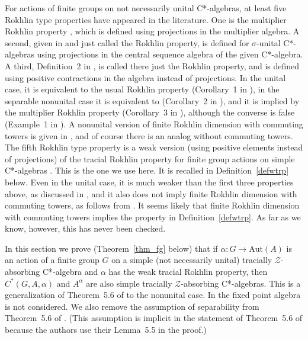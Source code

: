 \documentclass[11pt]{amsart}
\theoremstyle{plain}
\theoremstyle{definition}
\theoremstyle{remark}
\numberwithin{equation}{section}
\begin{document}
\indent
For actions of finite groups on not necessarily unital C*-algebras,
at least five Rokhlin type properties have appeared in the literature.
One is the multiplier Rokhlin property \cite[Definition~2.15]{Ph09},
which is defined using projections in the multiplier algebra.
A second, given in \cite[Definition~3.1]{Naw2016}
and just called the Rokhlin property,
is defined for $\sigma$-unital C*-algebras using projections
in the central sequence algebra of the given C*-algebra.
A third,
Definition~2 in \cite[Section~3]{San15},
is called there just the Rokhlin property,
and is defined using positive contractions
in the algebra instead of projections.
In the unital case,
it is equivalent to the usual Rokhlin property
(Corollary~1 in \cite[Section~3]{San15}),
in the separable nonunital case
it is equivalent to \cite[Definition~3.1]{Naw2016}
(Corollary~2 in \cite[Section~3]{San15}),
and it is implied by the multiplier Rokhlin property
(Corollary~3 in \cite[Section~3]{San15}),
although the converse is false
(Example~1 in \cite[Section~3]{San15}).
A nonunital version of finite Rokhlin dimension with commuting towers
is given in \cite[Definition 1.14]{HrsPh1},
and of course there is an analog without commuting towers.
The fifth Rokhlin type property
is a weak version
(using positive elements instead of projections)
of the tracial Rokhlin property
for finite group actions on simple
C*-algebras \cite{FG17}.
This is the one we use here.
It is recalled in Definition~\ref{defwtrp} below.
Even in the unital case,
it is much weaker than the first three
properties above,
as discussed in \cite[Example 3.12]{Ph09},
and
it also does not imply finite Rokhlin dimension with commuting towers,
as follows from \cite[Corollary 4.8]{HrsPh1}.
It seems likely that finite Rokhlin dimension with commuting towers
implies the property in Definition~\ref{defwtrp}.
As far as we know,
however, this has never been checked.

In this section we prove
(Theorem~\ref{thm_fg} below) that
if $\alpha \colon G \to \mathrm{Aut} (A)$ is an
action of a finite group $G$ on a simple (not necessarily unital)
tracially $\mathcal{Z}$-absorbing C*-algebra
and $\alpha$ has the weak tracial Rokhlin property,
then $C^{*} (G, A, \alpha)$ and $A^{\alpha}$ are also simple
tracially $\mathcal{Z}$-absorbing C*-algebras.
This is a generalization
of Theorem~5.6 of \cite{HO13} to the nonunital case.
In \cite{HO13} the fixed point algebra is not considered.
We also remove the assumption of separability
from Theorem~5.6 of \cite{HO13}.
(This assumption
is implicit in the statement of Theorem~5.6 of \cite{HO13}
because the authors use their Lemma~5.5 in the proof.)
\end{document}
